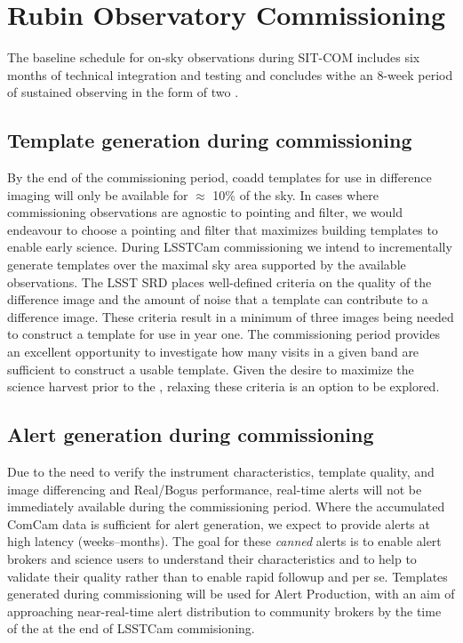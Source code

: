 \section{Rubin Observatory Commissioning} 
\label{sec:commissioning}

The baseline schedule for on-sky observations during SIT-COM includes six months of technical integration and testing and concludes withe an 8-week period of sustained observing in the form of two \svs \citep{SCTN-007}. 

\subsection{Template generation during commissioning}

By the end of the commissioning period, coadd templates for use in difference imaging will only be available for $\approx$ 10\% of the sky. 
In cases where commissioning observations are agnostic to pointing and filter, we would endeavour to choose a pointing and filter that maximizes building templates to enable early science. 
During LSSTCam commissioning we intend to incrementally generate templates over the maximal sky area supported by the available observations.
The LSST SRD places well-defined criteria on the quality of the difference image and the amount of noise that a template can contribute to a difference image.  
These criteria result in a minimum of three images being needed to construct a template for use in year one.  
The commissioning period provides an excellent opportunity to investigate how many visits in a given band are sufficient to construct a usable template. 
Given the desire to maximize the science harvest prior to the \drone,  relaxing these criteria is an option to be explored. 

\subsection{Alert generation during commissioning}

Due to the need to verify the instrument characteristics, template quality, and image differencing and Real/Bogus performance, real-time alerts will not be immediately available during the commissioning period. 
Where the accumulated ComCam data is sufficient for alert generation, we expect to provide alerts at high latency (weeks--months). 
The goal for these {\it canned} alerts is to enable alert brokers and science users to understand their characteristics and to help to validate their quality rather than to enable rapid followup and \es per se.
Templates generated during commissioning will be used for Alert Production, with an aim of approaching near-real-time alert distribution to community brokers by the time of the \svs at the end of LSSTCam commisioning. 

